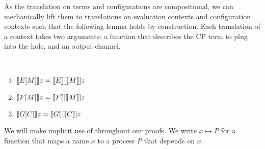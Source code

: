 \documentclass[oribibl,orivec,envcountsame]{llncs}
\begin{document}
As the translation on terms and configurations are compositional, we can mechanically lift them to
translations on evaluation contexts and configuration contexts such that the following lemma holds
by construction.
%
Each translation of a context takes two arguments: a function that describes the CP term to plug
into the hole, and an output channel.
%
%
\begin{lemma}
\label{lem:compositional-contexts}
~
\begin{enumerate}
\item $\llbracket E[M] \rrbracket z = \llbracket E \rrbracket[\llbracket M \rrbracket]z$
\item $\llbracket F[M] \rrbracket z = \llbracket F \rrbracket[\llbracket M \rrbracket]z$
\item $\llbracket G[C] \rrbracket z = \llbracket G \rrbracket[\llbracket C \rrbracket]z$
\end{enumerate}
\end{lemma}
%
We will make implicit use of  throughout our proofs. We write
$x \mapsto P$ for a function that maps a name $x$ to a process $P$ that depends on $x$.
\end{document}
